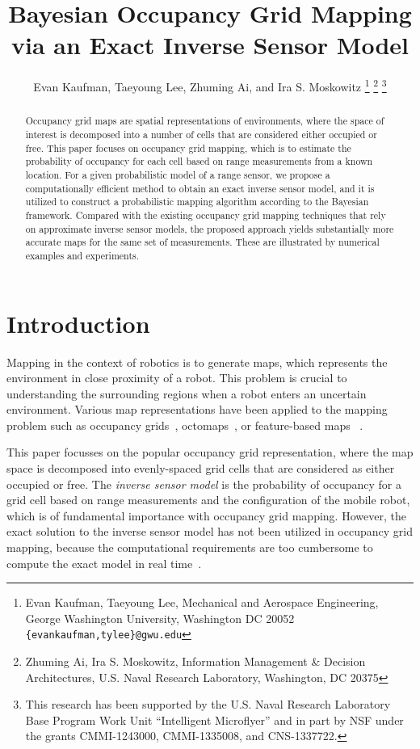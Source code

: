 \documentclass[letterpaper, 10pt, conference]{ieeeconf}
\title{\LARGE \bf
Bayesian Occupancy Grid Mapping via an Exact Inverse Sensor Model}
\author{Evan Kaufman, Taeyoung Lee, Zhuming Ai, and Ira S. Moskowitz%
\thanks{Evan Kaufman, Taeyoung Lee, Mechanical and Aerospace Engineering, George Washington University, Washington DC 20052 {\tt \{evankaufman,tylee\}@gwu.edu}}
\thanks{Zhuming Ai, Ira S. Moskowitz, Information Management \& Decision Architectures, U.S. Naval Research Laboratory,  Washington, DC 20375}
\thanks{This research has been supported by the U.S. Naval Research Laboratory Base Program Work Unit ``Intelligent Microflyer'' and in part by NSF under the grants CMMI-1243000, CMMI-1335008, and CNS-1337722.}
}
\begin{document}
\allowdisplaybreaks


\maketitle \thispagestyle{empty} \pagestyle{empty}

\begin{abstract}
Occupancy grid maps are spatial representations of environments, where the space of interest is decomposed into a number of cells that are considered either occupied or free. This paper focuses on occupancy grid mapping, which is to estimate the probability of occupancy for each cell based on range measurements from a known location. For a given probabilistic model of a range sensor, we propose a computationally efficient method to obtain an exact inverse sensor model, and it is utilized to construct a probabilistic mapping algorithm according to the Bayesian framework. Compared with the existing occupancy grid mapping techniques that rely on approximate inverse sensor models, the proposed approach yields substantially more accurate maps for the same set of measurements. These are illustrated by numerical examples and experiments. 
\end{abstract}

\section{Introduction}

Mapping in the context of robotics is to generate maps, which represents the environment in close proximity of a robot. This problem is crucial to understanding the surrounding regions when a robot enters an uncertain environment.
Various map representations have been applied to the mapping problem such as occupancy grids~\cite{WolSuk05}, octomaps~\cite{WurHorBenStaBur10}, or feature-based maps%
~\cite{MonThrKolWeg02}.

This paper focusses on the popular occupancy grid representation, where the map space is decomposed into evenly-spaced grid cells that are considered as either occupied or free.
The \emph{inverse sensor model} is the probability of occupancy for a grid cell based on range measurements and the configuration of the mobile robot, which is of fundamental importance with occupancy grid mapping. However, the exact solution to the inverse sensor model has not been utilized in occupancy grid mapping, because the computational requirements are too cumbersome to compute the exact model in real time~\cite{ThrBurFox05}.
\end{document}
